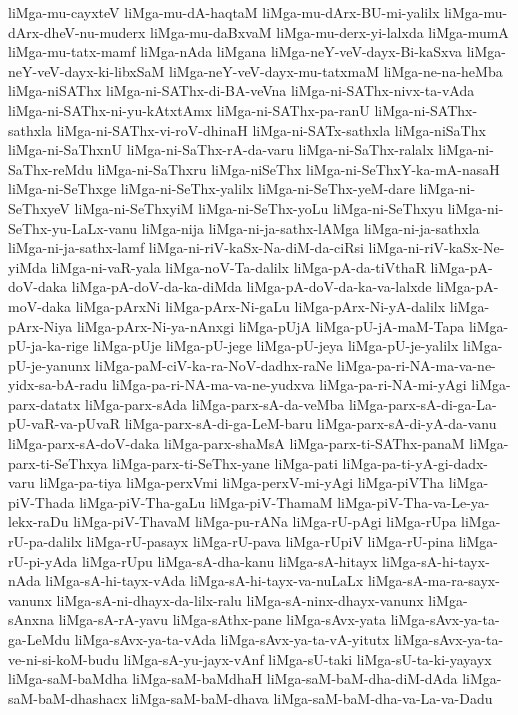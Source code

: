 {liMga-mu-cayxteV
liMga-mu-dA-haqtaM
liMga-mu-dArx-BU-mi-yalilx
liMga-mu-dArx-dheV-nu-muderx
liMga-mu-daBxvaM
liMga-mu-derx-yi-lalxda
liMga-mumA
liMga-mu-tatx-mamf
liMga-nAda
liMgana
liMga-neY-veV-dayx-Bi-kaSxva
liMga-neY-veV-dayx-ki-libxSaM
liMga-neY-veV-dayx-mu-tatxmaM
liMga-ne-na-heMba
liMga-niSAThx
liMga-ni-SAThx-di-BA-veVna
liMga-ni-SAThx-nivx-ta-vAda
liMga-ni-SAThx-ni-yu-kAtxtAmx
liMga-ni-SAThx-pa-ranU
liMga-ni-SAThx-sathxla
liMga-ni-SAThx-vi-roV-dhinaH
liMga-ni-SATx-sathxla
liMga-niSaThx
liMga-ni-SaThxnU
liMga-ni-SaThx-rA-da-varu
liMga-ni-SaThx-ralalx
liMga-ni-SaThx-reMdu
liMga-ni-SaThxru
liMga-niSeThx
liMga-ni-SeThxY-ka-mA-nasaH
liMga-ni-SeThxge
liMga-ni-SeThx-yalilx
liMga-ni-SeThx-yeM-dare
liMga-ni-SeThxyeV
liMga-ni-SeThxyiM
liMga-ni-SeThx-yoLu
liMga-ni-SeThxyu
liMga-ni-SeThx-yu-LaLx-vanu
liMga-nija
liMga-ni-ja-sathx-lAMga
liMga-ni-ja-sathxla
liMga-ni-ja-sathx-lamf
liMga-ni-riV-kaSx-Na-diM-da-ciRsi
liMga-ni-riV-kaSx-Ne-yiMda
liMga-ni-vaR-yala
liMga-noV-Ta-dalilx
liMga-pA-da-tiVthaR
liMga-pA-doV-daka
liMga-pA-doV-da-ka-diMda
liMga-pA-doV-da-ka-va-lalxde
liMga-pA-moV-daka
liMga-pArxNi
liMga-pArx-Ni-gaLu
liMga-pArx-Ni-yA-dalilx
liMga-pArx-Niya
liMga-pArx-Ni-ya-nAnxgi
liMga-pUjA
liMga-pU-jA-maM-Tapa
liMga-pU-ja-ka-rige
liMga-pUje
liMga-pU-jege
liMga-pU-jeya
liMga-pU-je-yalilx
liMga-pU-je-yanunx
liMga-paM-ciV-ka-ra-NoV-dadhx-raNe
liMga-pa-ri-NA-ma-va-ne-yidx-sa-bA-radu
liMga-pa-ri-NA-ma-va-ne-yudxva
liMga-pa-ri-NA-mi-yAgi
liMga-parx-datatx
liMga-parx-sAda
liMga-parx-sA-da-veMba
liMga-parx-sA-di-ga-La-pU-vaR-va-pUvaR
liMga-parx-sA-di-ga-LeM-baru
liMga-parx-sA-di-yA-da-vanu
liMga-parx-sA-doV-daka
liMga-parx-shaMsA
liMga-parx-ti-SAThx-panaM
liMga-parx-ti-SeThxya
liMga-parx-ti-SeThx-yane
liMga-pati
liMga-pa-ti-yA-gi-dadx-varu
liMga-pa-tiya
liMga-perxVmi
liMga-perxV-mi-yAgi
liMga-piVTha
liMga-piV-Thada
liMga-piV-Tha-gaLu
liMga-piV-ThamaM
liMga-piV-Tha-va-Le-ya-lekx-raDu
liMga-piV-ThavaM
liMga-pu-rANa
liMga-rU-pAgi
liMga-rUpa
liMga-rU-pa-dalilx
liMga-rU-pasayx
liMga-rU-pava
liMga-rUpiV
liMga-rU-pina
liMga-rU-pi-yAda
liMga-rUpu
liMga-sA-dha-kanu
liMga-sA-hitayx
liMga-sA-hi-tayx-nAda
liMga-sA-hi-tayx-vAda
liMga-sA-hi-tayx-va-nuLaLx
liMga-sA-ma-ra-sayx-vanunx
liMga-sA-ni-dhayx-da-lilx-ralu
liMga-sA-ninx-dhayx-vanunx
liMga-sAnxna
liMga-sA-rA-yavu
liMga-sAthx-pane
liMga-sAvx-yata
liMga-sAvx-ya-ta-ga-LeMdu
liMga-sAvx-ya-ta-vAda
liMga-sAvx-ya-ta-vA-yitutx
liMga-sAvx-ya-ta-ve-ni-si-koM-budu
liMga-sA-yu-jayx-vAnf
liMga-sU-taki
liMga-sU-ta-ki-yayayx
liMga-saM-baMdha
liMga-saM-baMdhaH
liMga-saM-baM-dha-diM-dAda
liMga-saM-baM-dhashacx
liMga-saM-baM-dhava
liMga-saM-baM-dha-va-La-va-Dadu
}

